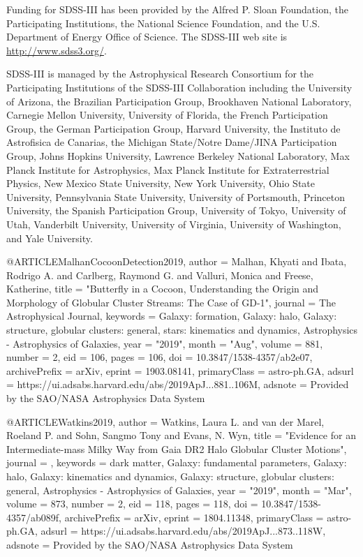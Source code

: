 \documentclass[apj]{emulateapj}
\begin{document}
Funding for SDSS-III has been provided by the Alfred P. Sloan Foundation, the Participating Institutions, the National Science Foundation, and the U.S. Department of Energy Office of Science. The SDSS-III web site is \url{http://www.sdss3.org/}.

SDSS-III is managed by the Astrophysical Research Consortium for the Participating Institutions of the SDSS-III Collaboration including the University of Arizona, the Brazilian Participation Group, Brookhaven National Laboratory, Carnegie Mellon University, University of Florida, the French Participation Group, the German Participation Group, Harvard University, the Instituto de Astrofisica de Canarias, the Michigan State/Notre Dame/JINA Participation Group, Johns Hopkins University, Lawrence Berkeley National Laboratory, Max Planck Institute for Astrophysics, Max Planck Institute for Extraterrestrial Physics, New Mexico State University, New York University, Ohio State University, Pennsylvania State University, University of Portsmouth, Princeton University, the Spanish Participation Group, University of Tokyo, University of Utah, Vanderbilt University, University of Virginia, University of Washington, and Yale University. 



@ARTICLE{MalhanCocoonDetection2019,
       author = {{Malhan}, Khyati and {Ibata}, Rodrigo A. and {Carlberg}, Raymond G. and
         {Valluri}, Monica and {Freese}, Katherine},
        title = "{Butterfly in a Cocoon, Understanding the Origin and Morphology of Globular Cluster Streams: The Case of GD-1}",
      journal = {The Astrophysical Journal},
     keywords = {Galaxy: formation, Galaxy: halo, Galaxy: structure, globular clusters: general, stars: kinematics and dynamics, Astrophysics - Astrophysics of Galaxies},
         year = "2019",
        month = "Aug",
       volume = {881},
       number = {2},
          eid = {106},
        pages = {106},
          doi = {10.3847/1538-4357/ab2e07},
archivePrefix = {arXiv},
       eprint = {1903.08141},
 primaryClass = {astro-ph.GA},
       adsurl = {https://ui.adsabs.harvard.edu/abs/2019ApJ...881..106M},
      adsnote = {Provided by the SAO/NASA Astrophysics Data System}
}

@ARTICLE{Watkins2019,
       author = {{Watkins}, Laura L. and {van der Marel}, Roeland P. and
         {Sohn}, Sangmo Tony and {Evans}, N. Wyn},
        title = "{Evidence for an Intermediate-mass Milky Way from Gaia DR2 Halo Globular Cluster Motions}",
      journal = {\apj},
     keywords = {dark matter, Galaxy: fundamental parameters, Galaxy: halo, Galaxy: kinematics and dynamics, Galaxy: structure, globular clusters: general, Astrophysics - Astrophysics of Galaxies},
         year = "2019",
        month = "Mar",
       volume = {873},
       number = {2},
          eid = {118},
        pages = {118},
          doi = {10.3847/1538-4357/ab089f},
archivePrefix = {arXiv},
       eprint = {1804.11348},
 primaryClass = {astro-ph.GA},
       adsurl = {https://ui.adsabs.harvard.edu/abs/2019ApJ...873..118W},
      adsnote = {Provided by the SAO/NASA Astrophysics Data System}
}
\end{document}

